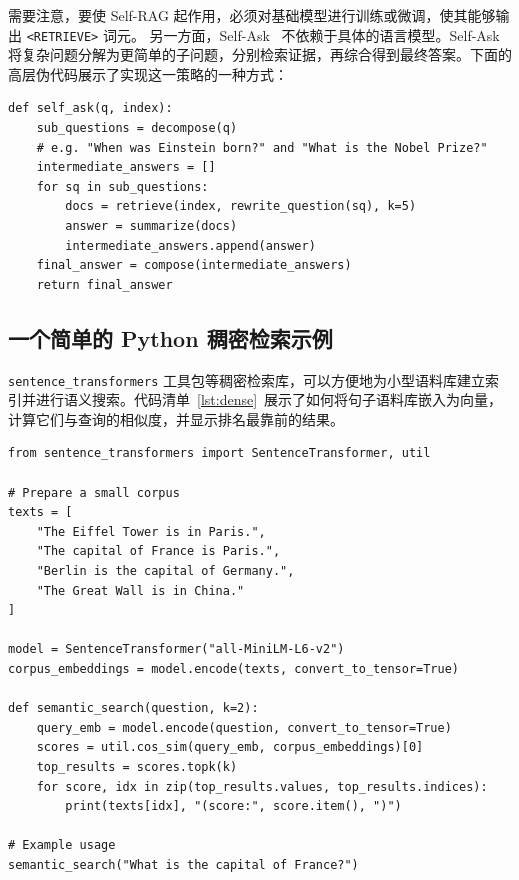 需要注意，要使 Self-RAG 起作用，必须对基础模型进行训练或微调，使其能够输出 \texttt{<RETRIEVE>} 词元。
另一方面，Self-Ask~\citep{press2022measuring} 不依赖于具体的语言模型。Self-Ask 将复杂问题分解为更简单的子问题，分别检索证据，再综合得到最终答案。下面的高层伪代码展示了实现这一策略的一种方式：

\begin{listing}[!ht]
\begin{verbatim}
def self_ask(q, index):
    sub_questions = decompose(q)  
    # e.g. "When was Einstein born?" and "What is the Nobel Prize?"
    intermediate_answers = []
    for sq in sub_questions:
        docs = retrieve(index, rewrite_question(sq), k=5)
        answer = summarize(docs)
        intermediate_answers.append(answer)
    final_answer = compose(intermediate_answers)
    return final_answer
\end{verbatim}
\caption{演示 Self-Ask 的高层伪代码}
\label{lst:selfask}
\end{listing}


\subsection{一个简单的 Python 稠密检索示例}

\texttt{sentence\_transformers} 工具包等稠密检索库，可以方便地为小型语料库建立索引并进行语义搜索。代码清单~\ref{lst:dense}~展示了如何将句子语料库嵌入为向量，计算它们与查询的相似度，并显示排名最靠前的结果。

\begin{listing}[!ht]
\begin{verbatim}
from sentence_transformers import SentenceTransformer, util

# Prepare a small corpus
texts = [
    "The Eiffel Tower is in Paris.",
    "The capital of France is Paris.",
    "Berlin is the capital of Germany.",
    "The Great Wall is in China."
]

model = SentenceTransformer("all-MiniLM-L6-v2")
corpus_embeddings = model.encode(texts, convert_to_tensor=True)

def semantic_search(question, k=2):
    query_emb = model.encode(question, convert_to_tensor=True)
    scores = util.cos_sim(query_emb, corpus_embeddings)[0]
    top_results = scores.topk(k)
    for score, idx in zip(top_results.values, top_results.indices):
        print(texts[idx], "(score:", score.item(), ")")

# Example usage
semantic_search("What is the capital of France?")
\end{verbatim}
\caption{一个简单的 Python 稠密检索示例}
\label{lst:dense}
\end{listing}


